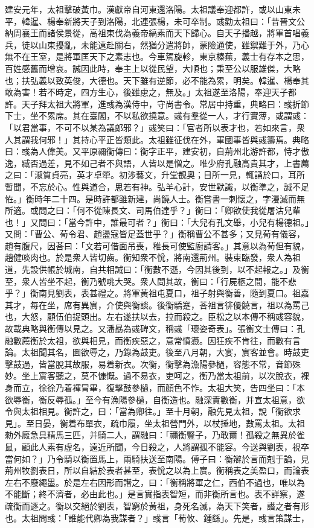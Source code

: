\begin{pinyinscope}
建安元年，太祖擊破黃巾。漢獻帝自河東還洛陽。太祖議奉迎都許，或以山東未平，韓暹、楊奉新將天子到洛陽，北連張楊，未可卒制。彧勸太祖曰：「昔晉文公納周襄王而諸侯景從，高祖東伐為義帝縞素而天下歸心。自天子播越，將軍首唱義兵，徒以山東擾亂，未能遠赴關右，然猶分遣將帥，蒙險通使，雖禦難于外，乃心無不在王室，是將軍匡天下之素志也。今車駕旋軫，東京榛蕪，義士有存本之思，百姓感舊而增哀。誠因此時，奉主上以從民望，大順也；秉至公以服雄傑，大略也；扶弘義以致英俊，大德也。天下雖有逆節，必不能為累，明矣。韓暹、楊奉其敢為害！若不時定，四方生心，後雖慮之，無及。」太祖遂至洛陽，奉迎天子都許。天子拜太祖大將軍，進彧為漢侍中，守尚書令。常居中持重，典略曰：彧折節下士，坐不累席。其在臺閣，不以私欲撓意。彧有羣從一人，才行實薄，或謂彧：「以君當事，不可不以某為議郎邪？」彧笑曰：「官者所以表才也，若如來言，衆人其謂我何邪！」其持心平正皆類此。太祖雖征伐在外，軍國事皆與彧籌焉。典略曰：彧為人偉美。又平原禰衡傳曰：衡字正平，建安初，自荊州北游許都，恃才傲逸，臧否過差，見不如己者不與語，人皆以是憎之。唯少府孔融高貴其才，上書薦之曰：「淑質貞亮，英才卓犖。初涉藝文，升堂覩奧；目所一見，輒誦於口，耳所暫聞，不忘於心。性與道合，思若有神。弘羊心計，安世默識，以衡準之，誠不足恠。」衡時年二十四。是時許都雖新建，尚饒人士。衡嘗書一刺懷之，字漫滅而無所適。或問之曰：「何不從陳長文、司馬伯達乎？」衡曰：「卿欲使我從屠沽兒輩也！」又問曰：「當今許中，誰最可者？」衡曰：「大兒有孔文舉，小兒有楊德祖。」又問：「曹公、荀令君、趙盪寇皆足蓋世乎？」衡稱曹公不甚多；又見荀有儀容，趙有腹尺，因荅曰：「文若可借面吊喪，稚長可使監廚請客。」其意以為荀但有貌，趙健啖肉也。於是衆人皆切齒。衡知衆不恱，將南還荊州。裝束臨發，衆人為祖道，先設供帳於城南，自共相誡曰：「衡數不遜，今因其後到，以不起報之。」及衡至，衆人皆坐不起，衡乃號咷大哭。衆人問其故，衡曰：「行屍柩之間，能不悲乎？」衡南見劉表，表甚禮之。將軍黃祖屯夏口，祖子射與衡善，隨到夏口。祖嘉其才，每在坐，席有異賔，介使與衡談。後衡驕蹇，荅祖言徘優饒言，祖以為罵己也，大怒，顧伍伯捉頭出。左右遂扶以去，拉而殺之。臣松之以本傳不稱彧容貌，故載典略與衡傳以見之。又潘勗為彧碑文，稱彧「瓌姿奇表」。張衡文士傳曰：孔融數薦衡於太祖，欲與相見，而衡疾惡之，意常憤懣。因狂疾不肯往，而數有言論。太祖聞其名，圖欲辱之，乃錄為鼓吏。後至八月朝，大宴，賔客並會。時鼓吏擊鼓過，皆當脫其故服，易着新衣。次衡，衡擊為漁陽參檛，容態不常，音節殊妙。坐上賔客聽之，莫不慷慨。過不易衣，吏呵之，衡乃當太祖前，以次脫衣，裸身而立，徐徐乃着褌冐畢，復擊鼓參檛，而顏色不怍。太祖大笑，告四坐曰：「本欲辱衡，衡反辱孤。」至今有漁陽參檛，自衡造也。融深責數衡，并宣太祖意，欲令與太祖相見。衡許之，曰：「當為卿往。」至十月朝，融先見太祖，說「衡欲求見」。至日晏，衡着布單衣，疏巾履，坐太祖營門外，以杖捶地，數罵太祖。太祖勑外廄急具精馬三匹，并騎二人，謂融曰：「禰衡豎子，乃敢爾！孤殺之無異於雀鼠，顧此人素有虛名，遠近所聞，今日殺之，人將謂孤不能容。今送與劉表，視卒當何如？」乃令騎以衡置馬上，兩騎扶送至南陽。傅子曰：衡辯於言而剋于論，見荊州牧劉表日，所以自結於表者甚至，表恱之以為上賔。衡稱表之美盈口，而論表左右不廢繩墨。於是左右因形而譖之，曰：「衡稱將軍之仁，西伯不過也，唯以為不能斷；終不濟者，必由此也。」是言實指表智短，而非衡所言也。表不詳察，遂疏衡而逐之。衡以交絕於劉表，智窮於黃祖，身死名滅，為天下笑者，譖之者有形也。太祖問彧：「誰能代卿為我謀者？」彧言「荀攸、鍾繇」。先是，彧言策謀士，
\end{pinyinscope}
